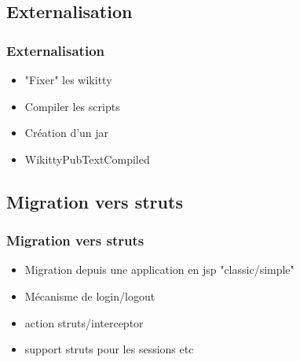 \documentclass[12pt,a4paper,utf8x]{beamer}
\begin{document}
\subsection*{Externalisation}
\begin{frame}\frametitle{Externalisation}
\begin{itemize}
\item "Fixer" les wikitty
\item Compiler les scripts
\item Création d'un jar
\item WikittyPubTextCompiled
\end{itemize}
\end{frame}

\subsection*{Migration vers struts}
\begin{frame}\frametitle{Migration vers struts}
\begin{itemize}
\item Migration depuis une application en jsp "classic/simple"
\item Mécanisme de login/logout
\item action struts/interceptor
\item support struts pour les sessions etc
\end{itemize}
\end{frame}
\end{document}
